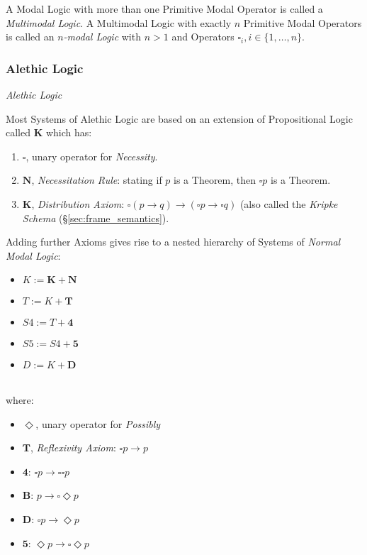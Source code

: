 A Modal Logic with more than one Primitive Modal Operator is called a
\emph{Multimodal Logic}. A Multimodal Logic with exactly $n$ Primitive
Modal Operators is called an \emph{$n$-modal Logic} with $n > 1$ and
Operators $\square_i, i \in \{1, \ldots, n\}$.



\subsubsection{Alethic Logic}\label{sec:alethic_logic}

\emph{Alethic Logic}

Most Systems of Alethic Logic are based on an extension of
Propositional Logic called $\mathbf{K}$ which has:

\begin{enumerate}
\item $\square$, unary operator for \emph{Necessity}.
\item $\mathbf{N}$, \emph{Necessitation Rule}: stating if $p$ is a
  Theorem, then $\square p$ is a Theorem.
\item $\mathbf{K}$, \emph{Distribution Axiom}: $\square(p \rightarrow
  q) \rightarrow (\square p \rightarrow \square q)$ (also called the
  \emph{Kripke Schema} (\S\ref{sec:frame_semantics}).
\end{enumerate}

Adding further Axioms gives rise to a nested hierarchy of Systems of
\emph{Normal Modal Logic}:

\begin{itemize}
\item $K := \mathbf{K} + \mathbf{N}$
\item $T := K + \mathbf{T}$
\item $S4 := T + \mathbf{4}$
\item $S5 := S4 + \mathbf{5}$
\item $D := K + \mathbf{D}$
\end{itemize} \hfill \\
where:

\begin{itemize}
\item $\Diamond$, unary operator for \emph{Possibly}
\item $\mathbf{T}$, \emph{Reflexivity Axiom}: $\square p \rightarrow p$
\item $\mathbf{4}$: $\square p \rightarrow \square \square p$
\item $\mathbf{B}$: $p \rightarrow \square \Diamond p$
\item $\mathbf{D}$: $\square p \rightarrow \Diamond p$
\item $\mathbf{5}$: $\Diamond p \rightarrow \square \Diamond p$
\end{itemize}



